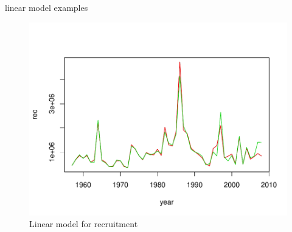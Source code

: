 \documentclass{beamer}\usepackage[]{graphicx}\usepackage[]{color}
\makeatletter
\def\maxwidth{ %
  \ifdim\Gin@nat@width>\linewidth
    \linewidth
  \else
    \Gin@nat@width
  \fi
}
\newenvironment{knitrout}{}{} %
\makeatother
\begin{document}
\begin{frame}{linear model examples}

\begin{knitrout}
\color{fgcolor}\begin{figure}[]

\includegraphics[width=\maxwidth]{figure/unnamed-chunk-4} \caption[Linear model for recruitment]{Linear model for recruitment\label{fig:unnamed-chunk-4}}
\end{figure}


\end{knitrout}


\end{frame}

%
%
%
%
%
\end{document}

